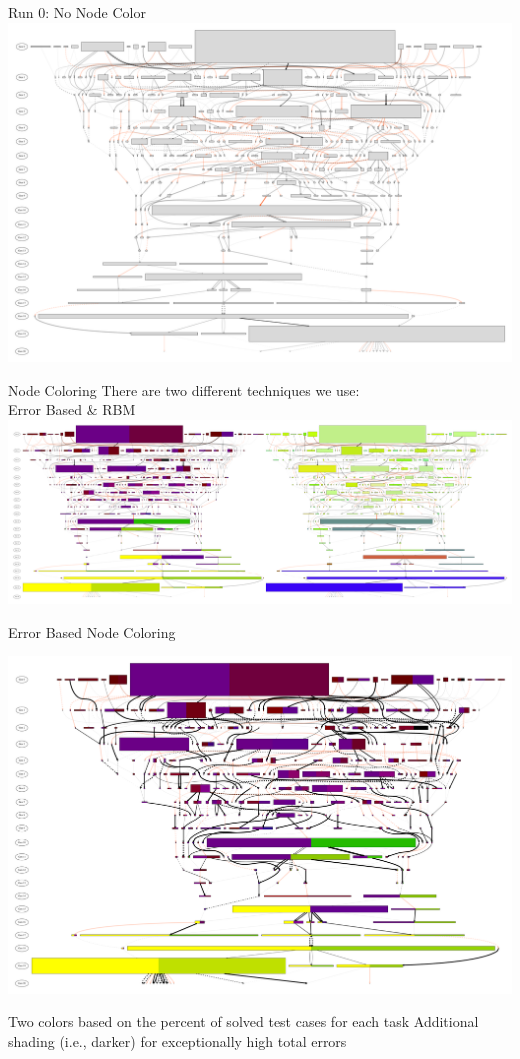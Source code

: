 \documentclass{beamer}
\begin{document}
\begin{frame}{Run 0: No Node Color}
\center \includegraphics[width=.93\textwidth]{Illustrations/run0_RBM_colored_edges_full_30000.pdf} 
\end{frame}

\begin{frame}{Node Coloring}
\center
{There are two different techniques we use:  \\ Error Based \& RBM}
\includegraphics[width=\textwidth]{Illustrations/run0_dual_and_RBM_full.pdf}
\end{frame}

\begin{frame}{Error Based Node Coloring}
	\begin{overprint}
		 			\centering
\includegraphics[width=.85\textwidth]{Illustrations/run0_bi_color_shaded_percent0.pdf}
	\end{overprint}
	\begin{overprint}
		\onslide<1>
		\centering
		Two colors based on the percent of solved test cases for each task
		\onslide<2>
		\centering
		Additional shading (i.e., darker) for exceptionally high total errors
	\end{overprint}
\end{frame}
\end{document}

